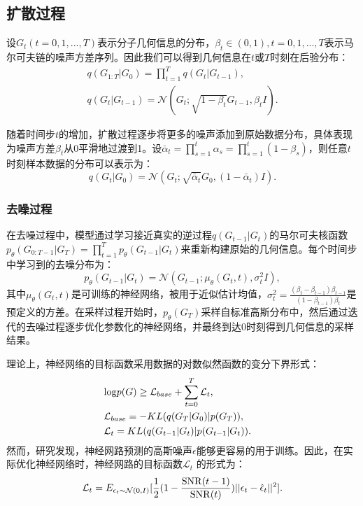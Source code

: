\subsection{扩散过程}
设$G_t (t=0, 1, ..., T)$表示分子几何信息的分布，$\beta_t \in (0, 1), t=0, 1, ..., T$表示马尔可夫链的噪声方差序列。因此我们可以得到几何信息在$t$或$T$时刻在后验分布：
\begin{eqnarray}
&q(G_{1:T} | G_0) = \prod^T_{t=1} q(G_t | G_{t-1}), & \\
&q(G_t | G_{t-1}) = \mathcal{N}(G_t; \sqrt{1-\beta_t}G_{t-1}, \beta_t I).&
\end{eqnarray}

随着时间步$t$的增加，扩散过程逐步将更多的噪声添加到原始数据分布，具体表现为噪声方差$\beta_t$从0平滑地过渡到1。设$\bar{\alpha}_t = \prod^t_{s=1} \alpha_s = \prod^t_{s=1}(1-\beta_s)$，则任意$t$时刻样本数据的分布可以表示为：
\begin{equation}
    q(G_t|G_0) = \mathcal{N}(G_t; \sqrt{\bar{\alpha}_t} G_0, (1 - \bar{\alpha}_t) I).
\end{equation} 

\subsubsection{去噪过程}
在去噪过程中，模型通过学习接近真实的逆过程$q(G_{t-1} | G_t)$的马尔可夫核函数$p_\theta(G_{0:T-1}| G_{T}) = \prod^T_{t=1} p_\theta(G_{t-1} | G_t)$来重新构建原始的几何信息。每个时间步中学习到的去噪分布为： 
\begin{equation}
  p_\theta(G_{t-1} | G_t) = \mathcal{N}(G_{t-1}; \mu_\theta(G_t, t), \sigma_t^2 I),
\end{equation}
其中$\mu_\theta(G_t, t)$是可训练的神经网络，被用于近似估计均值，$\sigma^2_t = \frac{(\beta_t - \beta_{t-1})\beta_{t-1}}{(1 - \beta_{t-1}) \beta_t}$是预定义的方差。在采样过程开始时，$p_\theta(G_T)$采样自标准高斯分布中，然后通过迭代的去噪过程逐步优化参数化的神经网络，并最终到达0时刻得到几何信息的采样结果。

理论上，神经网络的目标函数采用数据的对数似然函数的变分下界形式：
\begin{eqnarray}
    &{\rm log}p(G) \geq \mathcal{L}_{base} + \sum_{t=0}^T \mathcal{L}_t,& \\
    &\mathcal{L}_{base} = -KL(q(G_T|G_0)|p(G_T)),& \\
    &\mathcal{L}_t = KL(q(G_{t-1}|G_t)|p(G_{t-1}|G_t)). &
\end{eqnarray}
然而，研究发现，神经网路预测的高斯噪声$\epsilon$能够更容易的用于训练。因此，在实际优化神经网络时，神经网路的目标函数$\mathcal{L}_t$ \cite{vaediff_kingma_21}的形式为：
\begin{equation}
    \mathcal{L}_t = E_{\epsilon_t \sim \mathcal{N}(0, I)}[\frac{1}{2}(1- \frac{{\rm SNR}(t-1)}{{\rm SNR}(t)})||\epsilon_t - \hat{\epsilon}_t||^2].
\end{equation}

